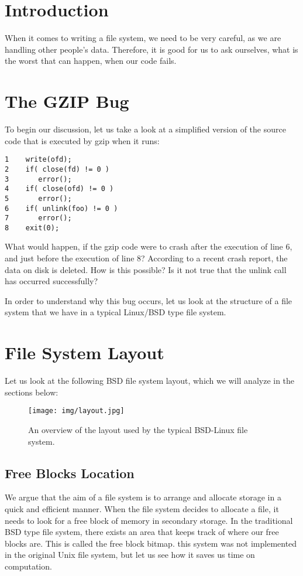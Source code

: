 \documentclass[a4paper]{article}
\begin{document}
\section{Introduction}

When it comes to writing a file system, we need to be very careful, as we are handling other people's data. Therefore, it is good for us to ask ourselves, what is the worst that can happen, when our code fails. 

\section{The GZIP Bug}
To begin our discussion, let us take a look at a simplified version of the source code that is executed by gzip when it runs:

\begin{lstlisting}
1    write(ofd);
2    if( close(fd) != 0 )
3    	error();
4    if( close(ofd) != 0 )
5    	error();
6    if( unlink(foo) != 0 )
7    	error();
8    exit(0);
\end{lstlisting}

What would happen, if the gzip code were to crash after the execution of line 6, and just before the execution of line 8? According to a recent crash report, the data on disk is deleted. How is this possible? Is it not true that the unlink call has occurred successfully?

In order to understand why this bug occurs, let us look at the structure of a file system that we have in a typical Linux/BSD type file system.

\section{File System Layout}
Let us look at the following BSD file system layout, which we will analyze in the sections below:

\begin{figure}
\centering
\texttt{[image: img/layout.jpg]}
\caption{\label{fig:BLayout}An overview of the layout used by the typical BSD-Linux file system.}
\end{figure}

\subsection{Free Blocks Location}
We argue that the aim of a file system is to arrange and allocate storage in a quick and efficient manner. When the file system decides to allocate a file, it needs to look for a free block of memory in secondary storage. In the traditional BSD type file system, there exists an area that keeps track of where our free blocks are. This is called the free block bitmap. this system was not implemented in the original Unix file system, but let us see how it saves us time on computation.
\end{document}
